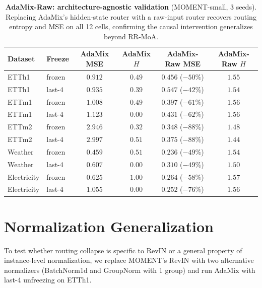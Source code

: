 \documentclass{article}
\begin{document}
\begin{table}[!htbp]
\centering
\caption{\textbf{AdaMix-Raw: architecture-agnostic validation} (MOMENT-small, 3 seeds). Replacing AdaMix's hidden-state router with a raw-input router recovers routing entropy and MSE on all 12 cells, confirming the causal intervention generalizes beyond RR-MoA.}
\label{tab:adamix_raw}
\small
\begin{tabular}{@{}llcccc@{}}
\toprule
Dataset & Freeze & AdaMix MSE & AdaMix $H$ & AdaMix-Raw MSE & AdaMix-Raw $H$ \\
\midrule
ETTh1 & frozen & $0.912$ & $0.49$ & $\mathbf{0.456}$ {\scriptsize($-50\%$)} & $1.55$ \\
ETTh1 & last-4 & $0.935$ & $0.39$ & $\mathbf{0.547}$ {\scriptsize($-42\%$)} & $1.54$ \\
ETTm1 & frozen & $1.008$ & $0.49$ & $\mathbf{0.397}$ {\scriptsize($-61\%$)} & $1.56$ \\
ETTm1 & last-4 & $1.123$ & $0.00$ & $\mathbf{0.431}$ {\scriptsize($-62\%$)} & $1.56$ \\
ETTm2 & frozen & $2.946$ & $0.32$ & $\mathbf{0.348}$ {\scriptsize($-88\%$)} & $1.48$ \\
ETTm2 & last-4 & $2.997$ & $0.51$ & $\mathbf{0.375}$ {\scriptsize($-88\%$)} & $1.44$ \\
Weather & frozen & $0.459$ & $0.51$ & $\mathbf{0.236}$ {\scriptsize($-49\%$)} & $1.54$ \\
Weather & last-4 & $0.607$ & $0.00$ & $\mathbf{0.310}$ {\scriptsize($-49\%$)} & $1.50$ \\
Electricity & frozen & $0.625$ & $1.00$ & $\mathbf{0.264}$ {\scriptsize($-58\%$)} & $1.57$ \\
Electricity & last-4 & $1.055$ & $0.00$ & $\mathbf{0.252}$ {\scriptsize($-76\%$)} & $1.56$ \\
\bottomrule
\end{tabular}
\end{table}

\section{Normalization Generalization}
\label{app:norm_generalization}

To test whether routing collapse is specific to RevIN or a general property of instance-level normalization, we replace MOMENT's RevIN with two alternative normalizers (BatchNorm1d and GroupNorm with 1 group) and run AdaMix with last-4 unfreezing on ETTh1.
\end{document}
